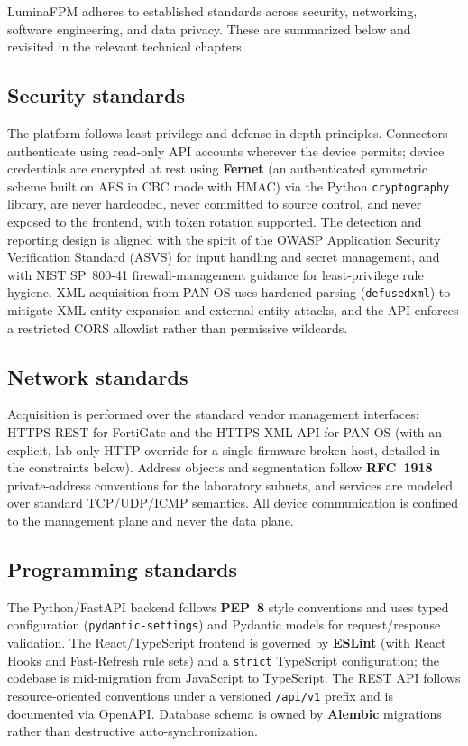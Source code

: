 \documentclass[12pt,a4paper]{report}
\renewcommand{\_}{\textunderscore\allowbreak}
\begin{document}
LuminaFPM adheres to established standards across security, networking, software engineering, and data privacy. These are summarized below and revisited in the relevant technical chapters.

\subsection{Security standards}
The platform follows least-privilege and defense-in-depth principles. Connectors authenticate using read-only API accounts wherever the device permits; device credentials are encrypted at rest using \textbf{Fernet} (an authenticated symmetric scheme built on AES in CBC mode with HMAC) via the Python \texttt{cryptography} library, are never hardcoded, never committed to source control, and never exposed to the frontend, with token rotation supported. The detection and reporting design is aligned with the spirit of the OWASP Application Security Verification Standard (ASVS) for input handling and secret management, and with NIST SP~800-41 firewall-management guidance for least-privilege rule hygiene. XML acquisition from PAN-OS uses hardened parsing (\texttt{defusedxml}) to mitigate XML entity-expansion and external-entity attacks, and the API enforces a restricted CORS allowlist rather than permissive wildcards.

\subsection{Network standards}
Acquisition is performed over the standard vendor management interfaces: HTTPS REST for FortiGate and the HTTPS XML API for PAN-OS (with an explicit, lab-only HTTP override for a single firmware-broken host, detailed in the constraints below). Address objects and segmentation follow \textbf{RFC~1918} private-address conventions for the laboratory subnets, and services are modeled over standard TCP/UDP/ICMP semantics. All device communication is confined to the management plane and never the data plane.

\subsection{Programming standards}
The Python/FastAPI backend follows \textbf{PEP~8} style conventions and uses typed configuration (\texttt{pydantic-settings}) and Pydantic models for request/response validation. The React/TypeScript frontend is governed by \textbf{ESLint} (with React Hooks and Fast-Refresh rule sets) and a \texttt{strict} TypeScript configuration; the codebase is mid-migration from JavaScript to TypeScript. The REST API follows resource-oriented conventions under a versioned \texttt{/api/v1} prefix and is documented via OpenAPI. Database schema is owned by \textbf{Alembic} migrations rather than destructive auto-synchronization.
\end{document}
